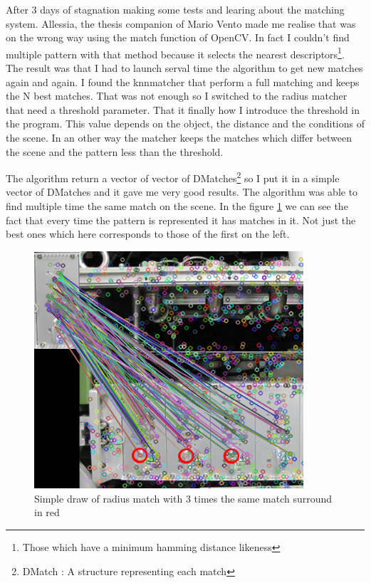	\par After 3 days of stagnation making some tests and learing about the matching system. Allessia, the thesis companion of Mario Vento made me realise that was on the wrong way using the match function of OpenCV. In fact I couldn't find multiple pattern with that method because it selects the nearest descriptors\footnote{Those which have a minimum hamming distance likeness}. The result was that I had to launch serval time the algorithm to get new matches again and again. I found the knnmatcher that perform a full matching and keeps the N best matches. That was not enough so I switched to the radius matcher that need a threshold parameter. That it finally how I introduce the threshold in the program. This value depends on the object, the distance and the conditions of the scene. In an other way the matcher keeps the matches which differ between the scene and the pattern less than the threshold.
	\par The algorithm return a vector of vector of DMatches\footnote{DMatch : A structure representing each match} so I put it in a simple vector of DMatches and it gave me very good results. The algorithm was able to find multiple time the same match on the scene. In the figure \ref{matches} we can see the fact that every time the pattern is represented it has matches in it. Not just the best ones which here corresponds to those of the first on the left.
	
	
	\begin{figure}[h]
		\begin{center}
			\includegraphics[width=10cm]{images_not_compressed/matches.jpg}
			\caption{Simple draw of radius match with 3 times the same match surround in red}
			\label{matches}	
		\end{center}
	\end{figure}
	
